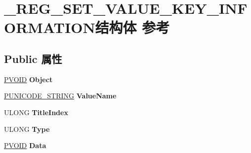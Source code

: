 \hypertarget{struct___r_e_g___s_e_t___v_a_l_u_e___k_e_y___i_n_f_o_r_m_a_t_i_o_n}{}\section{\+\_\+\+R\+E\+G\+\_\+\+S\+E\+T\+\_\+\+V\+A\+L\+U\+E\+\_\+\+K\+E\+Y\+\_\+\+I\+N\+F\+O\+R\+M\+A\+T\+I\+O\+N结构体 参考}
\label{struct___r_e_g___s_e_t___v_a_l_u_e___k_e_y___i_n_f_o_r_m_a_t_i_o_n}
\subsection*{Public 属性}
\begin{DoxyCompactItemize}
\item 
\mbox{\label{struct___r_e_g___s_e_t___v_a_l_u_e___k_e_y___i_n_f_o_r_m_a_t_i_o_n_a462ac43e4973d87631453d81161712c0}} 
\hyperlink{interfacevoid}{P\+V\+O\+ID} {\bfseries Object}
\item 
\mbox{\label{struct___r_e_g___s_e_t___v_a_l_u_e___k_e_y___i_n_f_o_r_m_a_t_i_o_n_a9b3cc52bfa44195bf52a4f01dc6f0493}} 
\hyperlink{struct___u_n_i_c_o_d_e___s_t_r_i_n_g}{P\+U\+N\+I\+C\+O\+D\+E\+\_\+\+S\+T\+R\+I\+NG} {\bfseries Value\+Name}
\item 
\mbox{\label{struct___r_e_g___s_e_t___v_a_l_u_e___k_e_y___i_n_f_o_r_m_a_t_i_o_n_a5ffa188e8a646b8ba09de61873c77109}} 
U\+L\+O\+NG {\bfseries Title\+Index}
\item 
\mbox{\label{struct___r_e_g___s_e_t___v_a_l_u_e___k_e_y___i_n_f_o_r_m_a_t_i_o_n_aba55114ec5f127e773a0b1902a98ed65}} 
U\+L\+O\+NG {\bfseries Type}
\item 
\mbox{\label{struct___r_e_g___s_e_t___v_a_l_u_e___k_e_y___i_n_f_o_r_m_a_t_i_o_n_a71f5cc0489081b3c884be28218fe276f}} 
\hyperlink{interfacevoid}{P\+V\+O\+ID} {\bfseries Data}

\end{DoxyCompactItemize}
